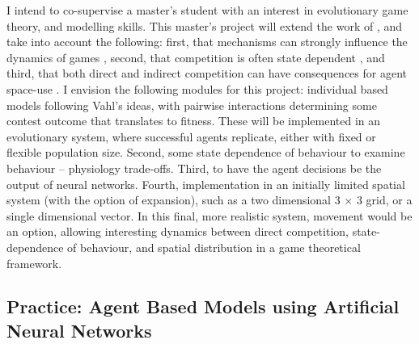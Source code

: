 I intend to co-supervise a master's student with an interest in evolutionary game theory, and modelling skills. This master's project will extend the work of \citet{vahl2006}, and take into account the following: first, that mechanisms can strongly influence the dynamics of games \citep{vandenberg2015a}, second, that competition is often state dependent \citep{vangils2004}, and third, that both direct and indirect competition \citep{vahl2005, bijleveld2012a} can have consequences for agent space-use \citep{vahl2007a}. I envision the following modules for this project: individual based models following Vahl's ideas, with pairwise interactions determining some contest outcome that translates to fitness. These will be implemented in an evolutionary system, where successful agents replicate, either with fixed or flexible population size. Second, some state dependence of behaviour to examine behaviour -- physiology trade-offs. Third, to have the agent decisions be the output of neural networks. Fourth, implementation in an initially limited spatial system (with the option of expansion), such as a two dimensional 3 × 3 grid, or a single dimensional vector. In this final, more realistic system, movement would be an option, allowing interesting dynamics between direct competition, state-dependence of behaviour, and spatial distribution in a game theoretical framework.

\subsection{Practice: Agent Based Models using Artificial Neural Networks}

